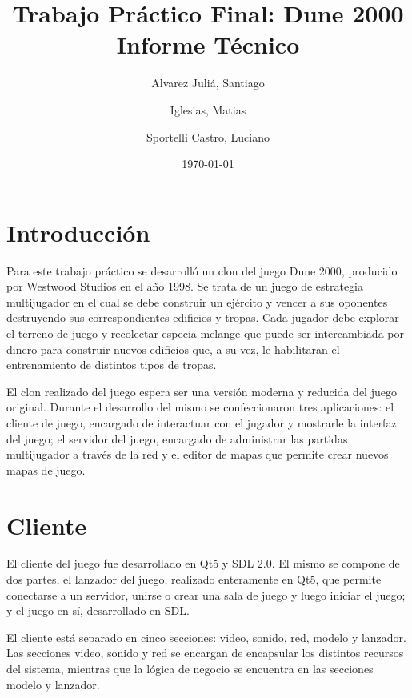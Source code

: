 \documentclass[titlepage,a4paper,12pt]{article}
\title{ Trabajo Práctico Final: Dune 2000 \\ 
 \large{Informe Técnico}}
\author{Alvarez Juliá, Santiago \and Iglesias, Matias \and Sportelli Castro, Luciano}
\date{ \today }
\begin{document}
\maketitle

\tableofcontents %

\newpage
\section{Introducción}
Para este trabajo práctico se desarrolló un clon del juego Dune 2000, producido por Westwood Studios en el año 1998. Se trata de un juego de estrategia multijugador en el cual se debe construir un ejército y vencer a sus oponentes destruyendo sus correspondientes edificios y tropas.
Cada jugador debe explorar el terreno de juego y recolectar especia melange que puede ser intercambiada por dinero para construir nuevos edificios que, a su vez, le habilitaran el entrenamiento de distintos tipos de tropas.

El clon realizado del juego espera ser una versión moderna y reducida del juego original. Durante el desarrollo del mismo se confeccionaron tres aplicaciones: el cliente de juego, encargado de interactuar con el jugador y mostrarle la interfaz del juego; el servidor del juego, encargado de administrar las partidas multijugador a través de la red y el editor de mapas que permite crear nuevos mapas de juego.

\section{Cliente}
El cliente del juego fue desarrollado en Qt5 y SDL 2.0. El mismo se compone de dos partes, el lanzador del juego, realizado enteramente en Qt5, que permite conectarse a un servidor, unirse o crear una sala de juego y luego iniciar el juego; y el juego en sí, desarrollado en SDL.

El cliente está separado en cinco secciones: video, sonido, red, modelo y lanzador. Las secciones video, sonido y red se encargan de encapsular los distintos recursos del sistema, mientras que la lógica de negocio se encuentra en las secciones modelo y lanzador.
\end{document}
